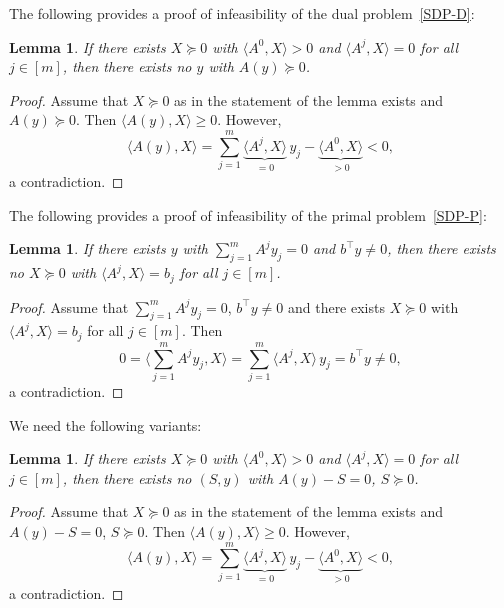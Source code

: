 \documentclass[10pt, a4paper]{article}
\newcommand{\skal}[2]{\langle{#1},{#2}\rangle}
\newcommand{\T}{^{\top}}
\newtheorem{lemma}[theorem]{Lemma}
\begin{document}
The following provides a proof of infeasibility of the dual problem~\eqref{SDP-D}:

\begin{lemma}\label{lemma:DualInfCertificate}
  If there exists $X \succeq 0$ with $\skal{A^0}{X} > 0$ and
  $\skal{A^j}{X} = 0$ for all $j \in [m]$, then there exists no $y$ with
  $A(y) \succeq 0$.
\end{lemma}

\begin{proof}
  Assume that $X \succeq 0$ as in the statement of the lemma exists and
  $A(y) \succeq 0$.  Then $\skal{A(y)}{X} \geq 0$. However,
  \[
  \skal{A(y)}{X} = \sum_{j=1}^m \underbrace{\skal{A^j}{X}}_{= 0}\, y_j -
  \underbrace{\skal{A^0}{X}}_{> 0} < 0,
  \]
  a contradiction.
\end{proof}

The following provides a proof of infeasibility of the primal problem~\eqref{SDP-P}:

\begin{lemma}\label{lemma:PrimalInfCertificate}
  If there exists $y$ with $\sum_{j=1}^m A^j y_j = 0$ and $b\T y \neq 0$, then
  there exists no $X \succeq 0$ with $\skal{A^j}{X} = b_j$ for all
  $j \in [m]$.
\end{lemma}

\begin{proof}
  Assume that $\sum_{j=1}^m A^j y_j = 0$, $b\T y \neq 0$ and there exists
  $X \succeq 0$ with $\skal{A^j}{X} = b_j$ for all $j \in [m]$. Then
  \[
  0 = \skal{\sum_{j=1}^m A^j y_j}{X} = \sum_{j=1}^m \skal{A^j}{X}\, y_j =
  b\T y \neq 0,
  \]
  a contradiction.
\end{proof}

We need the following variants:

\begin{lemma}\label{lemma:DualInfCertificate2}
  If there exists $X \succeq 0$ with $\skal{A^0}{X} > 0$ and
  $\skal{A^j}{X} = 0$ for all $j \in [m]$, then there exists no $(S,y)$
  with $A(y) - S = 0$, $S \succeq 0$.
\end{lemma}

\begin{proof}
  Assume that $X \succeq 0$ as in the statement of the lemma exists and
  $A(y) - S = 0$, $S \succeq 0$.  Then $\skal{A(y)}{X} \geq 0$. However,
  \[
  \skal{A(y)}{X} = \sum_{j=1}^m \underbrace{\skal{A^j}{X}}_{= 0}\, y_j -
  \underbrace{\skal{A^0}{X}}_{> 0} < 0,
  \]
  a contradiction.
\end{proof}
\end{document}
